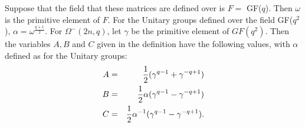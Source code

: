 \documentclass[12pt]{article}
\begin{document}
\hspace{25} {Suppose that the field that these matrices are defined over is $F =$ GF($q$). Then $\omega$ is the primitive element of $F$. For the Unitary groups defined over the field GF($q^2$), $\alpha = \omega^{\frac{q+1}{2}}$. For $\Omega^-(2n, q)$, let $\gamma$ be the primitive element of $GF(q^2).$ Then the variables $A, B$ and $C$ given in the definition have the following values, with $\alpha$ defined as for the Unitary groups: \begin{eqnarray*}
A & = & {1\over2}(\gamma^{q-1}+\gamma^{-q+1}) \\
B & = & {1\over2}\alpha(\gamma^{q-1}-\gamma^{-q+1}) \\
C &=& {1\over2}\alpha^{-1}(\gamma^{q-1}-\gamma^{-q+1}).
\end{eqnarray*} }

\newpage
\end{document}
